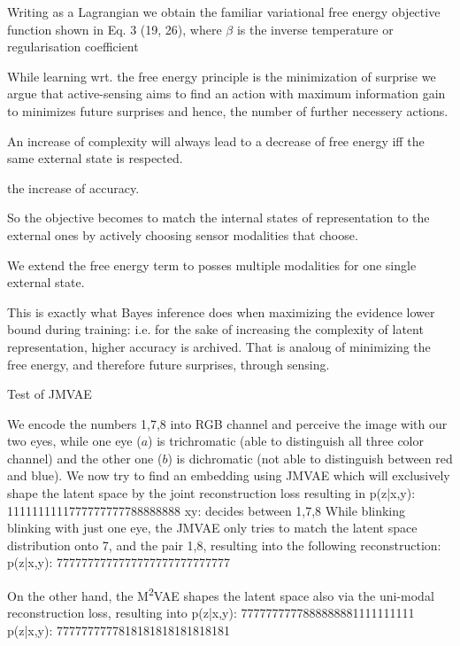 \begin{confidential}
Writing as a Lagrangian we obtain the familiar variational free energy objective function shown in Eq. 3 (19, 26), where $\beta$ is the inverse temperature or regularisation coefficient


While learning wrt. the free energy principle is the minimization of surprise we argue that active-sensing aims to find an action with maximum information gain to minimizes future surprises and hence, the number of further necessery actions.

An increase of complexity will always lead to a decrease of free energy iff the same external state is respected.

the increase of accuracy.

So the objective becomes to match the internal states of representation to the external ones by actively choosing sensor modalities that choose.

We extend the free energy term to posses multiple modalities for one single external state.

This is exactly what Bayes inference does when maximizing the evidence lower bound during training: i.e. for the sake of increasing the complexity of latent representation, higher accuracy is archived.
That is analoug of minimizing the free energy, and therefore future surprises, through sensing.

Test of JMVAE



We encode the numbers 1,7,8 into RGB channel and perceive the 
image with our two eyes, while one eye ($a$) is trichromatic (able to distinguish all three color channel) and the other one ($b$) is dichromatic (not able to distinguish between red and blue).
We now try to find an embedding using JMVAE which will exclusively shape the latent space by the joint reconstruction loss resulting in
p(z|x,y): 1111111111777777777788888888
xy: decides between 1,7,8
While blinking blinking with just one eye, the JMVAE only tries to match the latent space distribution onto 7, and the pair 1,8, resulting into the following reconstruction:
p(z|x,y): 7777777777777777777777777777

On the other hand, the M\textsuperscript{2}VAE shapes the latent space also via the uni-modal reconstruction loss, resulting into
p(z|x,y): 7777777777888888881111111111
p(z|x,y): 7777777777818181818181818181


\end{confidential}